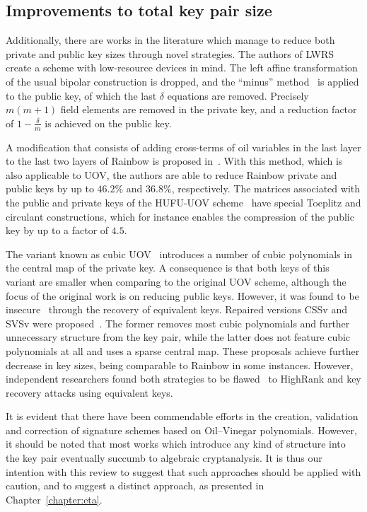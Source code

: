 \documentclass[draft, 12pt, a4paper, oneside]{memoir}
\theoremstyle{definition}
\begin{document}
\subsection{Improvements to total key pair size}\label{subsec:both}

Additionally, there are works in the literature which manage to reduce both private and public key sizes through novel strategies. The authors of LWRS~\cite{Zhang:201208} create a scheme with low-resource devices in mind. The left affine transformation of the usual bipolar construction is dropped, and the ``minus'' method~\cite[Subsection 3.2.1]{Wolf:200511} is applied to the public key, of which the last $\delta$ equations are removed. Precisely $m (m + 1)$ field elements are removed in the private key, and a reduction factor of $1 - \frac{\delta}{m}$ is achieved on the public key. 

A modification that consists of adding cross-terms of oil variables in the last layer to the last two layers of Rainbow is proposed in~\cite{Tan:201603}. With this method, which is also applicable to UOV, the authors are able to reduce Rainbow private and public keys by up to $46.2\%$ and $36.8\%$, respectively. The matrices associated with the public and private keys of the HUFU-UOV scheme~\cite{Tao:201905} have special Toeplitz and circulant constructions, which for instance enables the compression of the public key by up to a factor of $4.5$.

The variant known as cubic UOV~\cite{Nie:201511} introduces a number of cubic polynomials in the central map of the private key. A consequence is that both keys of this variant are smaller when comparing to the original UOV scheme, although the focus of the original work is on reducing public keys. However, it was found to be insecure~\cite{Hashimoto:201712} through the recovery of equivalent keys. Repaired versions CSSv and SVSv were proposed~\cite{Duong:201611}. The former removes most cubic polynomials and further unnecessary structure from the key pair, while the latter does not feature cubic polynomials at all and uses a sparse central map. These proposals achieve further decrease in key sizes, being comparable to Rainbow in some instances. However, independent researchers found both strategies to be flawed~\cite{Shim:201711,Hashimoto:201712} to HighRank and key recovery attacks using equivalent keys.

It is evident that there have been commendable efforts in the creation, validation and correction of signature schemes based on Oil--Vinegar polynomials. However, it should be noted that most works which introduce any kind of structure into the key pair eventually succumb to algebraic cryptanalysis. It is thus our intention with this review to suggest that such approaches should be applied with caution, and to suggest a distinct approach, as presented in Chapter~\ref{chapter:eta}.
\end{document}
